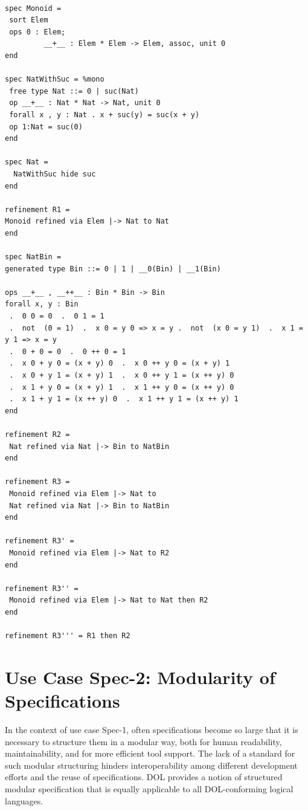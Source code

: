 \documentclass[10pt,fleqn,%
\ifpretendfinal
final%
\else
draft%
\fi,
]{scrreprt}
\begin{document}
\begin{lstlisting}[basicstyle=\ttfamily\footnotesize,language=dolText,morekeywords={sort, ops, refinement, free,spec type, assoc, unit,props,op,spec,refined, via,generated, then,ObjectProperty,Class,DisjointUnionOf,SubClassOf,Characteristics,Transitive,Asymmetric,SubPropertyOf,DisjointClasses,EquivalentTo,inverse,only,forall,iff,if,or,exists,distributed,from},escapechar=@,mathescape]	

spec Monoid =
 sort Elem
 ops 0 : Elem;
         __+__ : Elem * Elem -> Elem, assoc, unit 0
end

spec NatWithSuc = %mono
 free type Nat ::= 0 | suc(Nat)
 op __+__ : Nat * Nat -> Nat, unit 0 
 forall x , y : Nat . x + suc(y) = suc(x + y)
 op 1:Nat = suc(0)
end

spec Nat =
  NatWithSuc hide suc
end

refinement R1 =
Monoid refined via Elem |-> Nat to Nat
end

spec NatBin =
generated type Bin ::= 0 | 1 | __0(Bin) | __1(Bin)

ops __+__ , __++__ : Bin * Bin -> Bin 
forall x, y : Bin 
 .  0 0 = 0  .  0 1 = 1
 .  not  (0 = 1)  .  x 0 = y 0 => x = y .  not  (x 0 = y 1)  .  x 1 = y 1 => x = y
 .  0 + 0 = 0  .  0 ++ 0 = 1 
 .  x 0 + y 0 = (x + y) 0  .  x 0 ++ y 0 = (x + y) 1
 .  x 0 + y 1 = (x + y) 1  .  x 0 ++ y 1 = (x ++ y) 0 
 .  x 1 + y 0 = (x + y) 1  .  x 1 ++ y 0 = (x ++ y) 0
 .  x 1 + y 1 = (x ++ y) 0  .  x 1 ++ y 1 = (x ++ y) 1 
end

refinement R2 =
 Nat refined via Nat |-> Bin to NatBin
end

refinement R3 =
 Monoid refined via Elem |-> Nat to
 Nat refined via Nat |-> Bin to NatBin
end

refinement R3' =
 Monoid refined via Elem |-> Nat to R2
end

refinement R3'' = 
 Monoid refined via Elem |-> Nat to Nat then R2
end

refinement R3''' = R1 then R2

\end{lstlisting}

\section{Use Case Spec-2: Modularity of Specifications}\label{spec-2}
In the context of use case Spec-1, often specifications become so large that it is necessary to structure them in a modular way, both for human readability, 
maintainability, and for more efficient tool support. The lack of a standard for such modular structuring hinders interoperability among different development efforts 
and the reuse of specifications.
DOL  provides a notion of structured modular specification that is equally applicable to all DOL-conforming logical languages.
\end{document}
